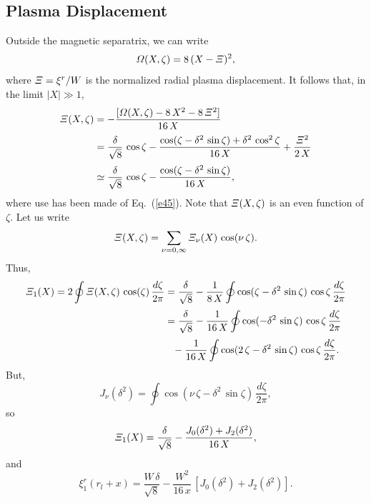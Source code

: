 \documentclass[12pt,prb,aps]{revtex4-1}
\begin{document}
\subsection{Plasma Displacement}
Outside the magnetic separatrix, we can write
\begin{equation}
{\mit\Omega}(X,\zeta) = 8\,(X-{\mit\Xi})^2,
\end{equation}
where ${\mit\Xi}= \xi^r/W$ is the normalized radial plasma displacement. It follows that, in the limit $|X|\gg 1$, 
\begin{align}
{\mit\Xi}(X,\zeta)&= -\frac{[{\mit\Omega}(X,\zeta)-8\,X^2 - 8\,{\mit\Xi}^2]}{16\,X}\nonumber\\[0.5ex]
&=\frac{\delta}{\sqrt{8}}\,\cos\zeta - \frac{\cos(\zeta-\delta^2\,\sin\zeta) +\delta^2\,\cos^2\zeta}{16\,X}+ \frac{{\mit\Xi}^2}{2\,X}\nonumber\\[0.5ex]
&\simeq \frac{\delta}{\sqrt{8}}\,\cos\zeta- \frac{\cos(\zeta-\delta^2\,\sin\zeta)}{16\,X},
\end{align}
where use has been made of Eq.~(\ref{e45}).
Note that ${\mit\Xi}(X,\zeta)$ is an even function of $\zeta$. 
Let us write
\begin{equation}
{\mit\Xi}(X,\zeta)= \sum_{\nu=0,\infty} {\mit\Xi}_\nu(X)\,\cos(\nu\,\zeta).
\end{equation}
Thus,
\begin{align}
{\mit\Xi}_1(X) =2 \oint {\mit\Xi}(X,\zeta)\,\cos(\zeta)\,\frac{d\zeta}{2\pi} &= \frac{\delta}{\sqrt{8}}-\frac{1}{8\,X}\oint\cos(\zeta-\delta^2\,\sin\zeta)\,\cos\zeta\,\frac{d\zeta}{2\pi}\nonumber \\[0.5ex]
&=\frac{\delta}{\sqrt{8}} -\frac{1}{16\,X}\oint\cos(-\delta^2\,\sin\zeta)\,\cos\zeta\,\frac{d\zeta}{2\pi}\nonumber\\[0.5ex]
&\phantom{=}- \frac{1}{16\,X}\oint\cos(2\,\zeta-\delta^2\,\sin\zeta)\,\cos\zeta\,\frac{d\zeta}{2\pi}.
\end{align}
But,\cite{bc,grx}
\begin{equation}
J_\nu(\delta^2) = \oint\cos(\nu\,\zeta-\delta^2\,\sin\zeta)\,\frac{d\zeta}{2\pi},
\end{equation}
so
\begin{equation}
{\mit\Xi}_1(X) =\frac{\delta}{\sqrt{8}} - \frac{J_0(\delta^2) + J_2(\delta^2)}{16\,X},
\end{equation}
and
\begin{equation}\label{ea}
\xi^r_1(r_{l}+x) = \frac{W\,\delta}{\sqrt{8}} - \frac{W^2}{16\,x}\,[J_0(\delta^2)+ J_2(\delta^2)].
\end{equation}
\end{document}
